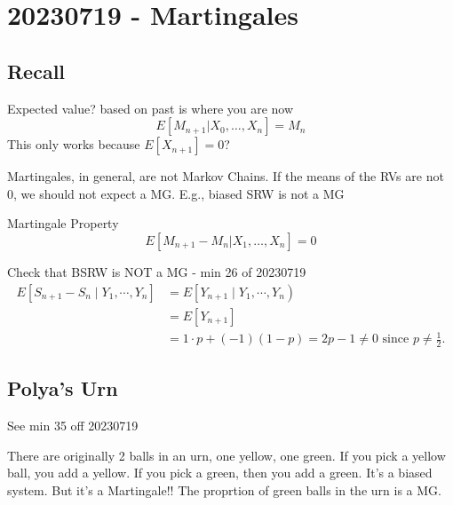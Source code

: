 \documentclass{report}
\begin{document}
\chapter{20230719 - Martingales}%
  \section{Recall}%
    Expected value?  based on past is where you are now
  \[ E[M_{n+1}|X_0, \dots, X_n] = M_n \]
  This only works because $E[X_{n+1}] = 0$?


  Martingales, in general, are not Markov Chains.  If the means of the RVs
  are not 0, we should not expect a MG.  E.g., biased SRW is not a MG

  Martingale Property
  \[ E[M_{n+1} - M_n | X_1, \dots, X_n] = 0 \]
    
  Check that BSRW is NOT a MG - min 26 of 20230719
    \begin{align*}
    E\left[S_{n+1}-S_n \mid Y_1, \cdots, Y_n\right] &= E\left[Y_{n+1} \mid Y_1, \cdots, Y_n\right) \\
          & =E\left[Y_{n+1}\right] \\
          & =1 \cdot p+(-1)(1-p)=2 p-1 \neq 0 \text { since } p \neq \frac{1}{2} .
    \end{align*}

    \section{Polya's Urn}
    See min 35 off 20230719

    There are originally 2 balls in an urn, one yellow, one green.  If
    you pick a yellow ball, you add a yellow.  If you pick a green, then
    you add a green.  It's a biased system.  But it's a Martingale!!  The
    proprtion of green balls in the urn is a MG.
\end{document}
